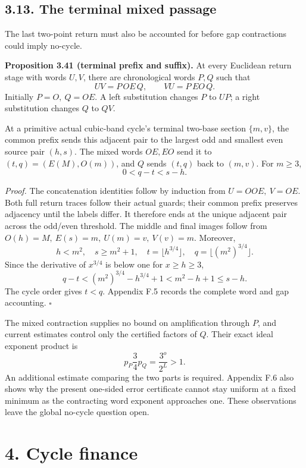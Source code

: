 \documentclass[12pt]{article}
\begin{document}
\subsection{3.13. The terminal mixed
passage}\label{the-terminal-mixed-passage}

The last two-point return must also be accounted for before gap
contractions could imply no-cycle.

\textbf{Proposition 3.41 (terminal prefix and suffix).} At every
Euclidean return stage with words \(U,V\), there are chronological words
\(P,Q\) such that \[
UV=P\,OE\,Q,\qquad VU=P\,EO\,Q.
\tag{SR4}
\] Initially \(P=O,\ Q=OE\). A left substitution changes \(P\) to
\(UP\); a right substitution changes \(Q\) to \(QV\).

At a primitive actual cubic-band cycle's terminal two-base section
\(\{m,v\}\), the common prefix sends this adjacent pair to the largest
odd and smallest even source pair \((h,s)\). The mixed words \(OE,EO\)
send it to \((t,q)=(E(M),O(m))\), and \(Q\) sends \((t,q)\) back to
\((m,v)\). For \(m\ge3\), \[
0<q-t<s-h.
\tag{SR5}
\]

\emph{Proof.} The concatenation identities follow by induction from
\(U=OOE,\ V=OE\). Both full return traces follow their actual guards;
their common prefix preserves adjacency until the labels differ. It
therefore ends at the unique adjacent pair across the odd/even
threshold. The middle and final images follow from
\(O(h)=M,\ E(s)=m,\ U(m)=v,\ V(v)=m\). Moreover, \[
h<m^2,\quad s\ge m^2+1,\quad
t=\lfloor h^{3/4}\rfloor,\quad
q=\lfloor(m^2)^{3/4}\rfloor.
\] Since the derivative of \(x^{3/4}\) is below one for \(x\ge h\ge3\),
\[
q-t<(m^2)^{3/4}-h^{3/4}+1<m^2-h+1\le s-h.
\] The cycle order gives \(t<q\). Appendix F.5 records the complete word
and gap accounting. \(\square\)

The mixed contraction supplies no bound on amplification through \(P\),
and current estimates control only the certified factors of \(Q\). Their
exact ideal exponent product is \[
p_P\frac34p_Q=\frac{3^o}{2^L}>1.
\] An additional estimate comparing the two parts is required. Appendix
F.6 also shows why the present one-sided error certificate cannot stay
uniform at a fixed minimum as the contracting word exponent approaches
one. These observations leave the global no-cycle question open.

\section{4. Cycle finance}\label{cycle-finance}
\end{document}
